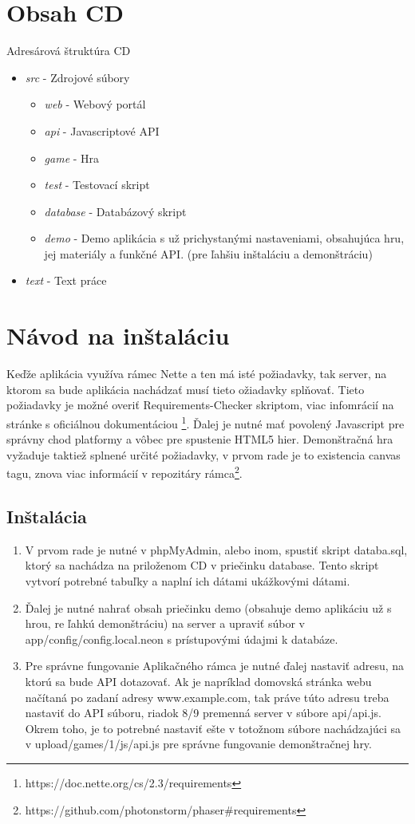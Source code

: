 \chapter{Obsah CD}
Adresárová štruktúra CD
\begin{itemize}
\item \textit{src} - Zdrojové súbory
    \begin{itemize}
    \item \textit{web} - Webový portál
    \item \textit{api} - Javascriptové API
    \item \textit{game} - Hra
    \item \textit{test} - Testovací skript
    \item \textit{database} - Databázový skript
    \item \textit{demo} - Demo aplikácia s už prichystanými nastaveniami, obsahujúca hru, jej materiály a funkčné API. (pre ľahšiu inštaláciu a demonštráciu)
    \end{itemize}
\item \textit{text} - Text práce
\end{itemize}

\chapter{Návod na inštaláciu}
Keďže aplikácia využíva rámec Nette a ten má isté požiadavky, tak server, na ktorom sa bude aplikácia nachádzať musí tieto ožiadavky splňovať. Tieto požiadavky je možné overiť Requirements-Checker skriptom, viac infomrácií na stránke s oficiálnou dokumentáciou \footnote{https://doc.nette.org/cs/2.3/requirements}. Ďalej je nutné mať povolený Javascript pre správny chod platformy a vôbec pre spustenie HTML5 hier. Demonštračná hra vyžaduje taktiež splnené určité požiadavky, v prvom rade je to existencia canvas tagu, znova viac informácií v repozitáry rámca\footnote{https://github.com/photonstorm/phaser\#requirements}.
\section{Inštalácia}
\begin{enumerate}
\item V prvom rade je nutné v phpMyAdmin, alebo inom, spustiť skript databa.sql, ktorý sa nachádza na priloženom CD v priečinku database. Tento skript vytvorí potrebné tabuľky a naplní ich dátami ukážkovými dátami. 
\item Ďalej je nutné nahrať obsah priečinku demo (obsahuje demo aplikáciu už s hrou, re ľahkú demonštráciu) na server a upraviť súbor v app/config/config.local.neon s prístupovými údajmi k databáze. 
\item Pre správne fungovanie Aplikačného rámca je nutné ďalej nastaviť adresu, na ktorú sa bude API dotazovať. Ak je napríklad domovská stránka webu načítaná po zadaní adresy www.example.com, tak práve túto adresu treba nastaviť do API súboru, riadok 8/9 premenná server v súbore api/api.js. Okrem toho, je to potrebné nastaviť ešte v totožnom súbore nachádzajúci sa v upload/games/1/js/api.js pre správne fungovanie demonštračnej hry.
\end{enumerate}

